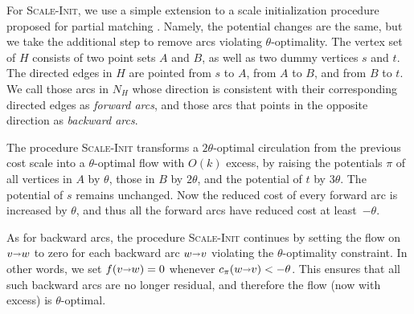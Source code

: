 \documentclass[a4paper,UKenglish]{socg-lipics-v2018}
\def\eps{\varepsilon}
\def\arcto{\mathord\shortrightarrow}
\def\arc#1#2{#1\arcto#2}
\def\supp{\operatorname{supp}}
\theoremstyle{plain}
\numberwithin{figure}{section}
\def\EMPH#1{\textcolor{BrickRed}{{\emph{#1}}}}
\begin{document}


For \textsc{Scale-Init}, we use a simple extension to a scale
initialization procedure proposed for partial matching \cite[Section~6.1]{GHKT17}.
Namely, the potential changes are the same, but we take the additional step
to remove arcs violating $\theta$-optimality.
The vertex set of $H$ consists of two point sets $A$ and $B$, as well as two dummy vertices $s$ and $t$.  The directed edges in $H$ are pointed from $s$ to $A$, from $A$ to $B$, and from $B$ to $t$.
We call those arcs in $N_H$ whose direction is consistent with their corresponding directed edges as \EMPH{forward arcs}, and those arcs that points in the opposite direction as \EMPH{backward arcs}.

The procedure \textsc{Scale-Init} transforms a $2\theta$-optimal circulation from the previous cost scale into a $\theta$-optimal flow with $O(k)$ excess, by raising the potentials $\pi$ of all vertices in $A$ by $\theta$, those in $B$ by $2\theta$, and the potential of $t$ by $3\theta$.
The potential of $s$ remains unchanged.
%
Now the reduced cost of every forward arc is increased by $\theta$, and thus all the forward arcs have reduced cost at least~$-\theta$.

As for backward arcs, the procedure \textsc{Scale-Init} continues by setting the flow on $\arc vw$ to zero for each backward arc $\arc wv$ violating the $\theta$-optimality constraint.  In other words, we set $f(\arc vw) = 0$ whenever $c_\pi(\arc wv) < -\theta$.
This ensures that all such backward arcs are no longer residual, and therefore the flow (now with excess) is $\theta$-optimal.
\end{document}
